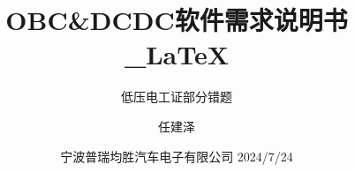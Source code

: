 \subtitle{低压电工证部分错题}
\title{OBC\&DCDC软件需求说明书\_\LaTeX }
\author{任建泽}
\date{宁波普瑞均胜汽车电子有限公司 2024/7/24}
\makecover
\clearpage
{} %
\setcounter{page}{1} %
\tableofcontents
\clearpage
{} %
\setcounter{page}{1} %

\setlength{\parindent}{2em}   %

